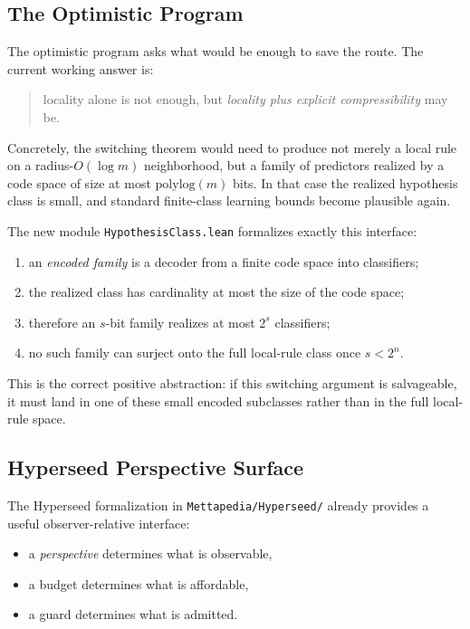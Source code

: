 \documentclass[11pt]{article}
\theoremstyle{remark}
\begin{document}
\subsection{The Optimistic Program}

The optimistic program asks what would be enough to save the route.
The current working answer is:
\begin{quote}
locality alone is not enough, but \emph{locality plus explicit compressibility} may be.
\end{quote}

Concretely, the switching theorem would need to produce not merely a local rule on a
radius-$O(\log m)$ neighborhood, but a family of predictors realized by a code space of
size at most \(\mathrm{polylog}(m)\) bits.  In that case the realized hypothesis class is
small, and standard finite-class learning bounds become plausible again.

The new module \texttt{HypothesisClass.lean} formalizes exactly this interface:
\begin{enumerate}[leftmargin=1.5em]
  \item an \emph{encoded family} is a decoder from a finite code space into classifiers;
  \item the realized class has cardinality at most the size of the code space;
  \item therefore an $s$-bit family realizes at most $2^s$ classifiers;
  \item no such family can surject onto the full local-rule class once $s < 2^n$.
\end{enumerate}

This is the correct positive abstraction: if this switching argument is salvageable, it must
land in one of these small encoded subclasses rather than in the full local-rule space.

\subsection{Hyperseed Perspective Surface}

The Hyperseed formalization in \texttt{Mettapedia/Hyperseed/} already provides a useful
observer-relative interface:
\begin{itemize}[leftmargin=1.5em]
  \item a \emph{perspective} determines what is observable,
  \item a budget determines what is affordable,
  \item a guard determines what is admitted.
\end{itemize}
\end{document}
